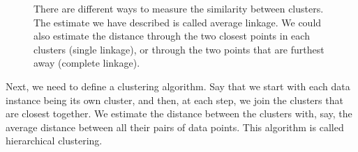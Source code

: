 \begin{figure}[h]
    \vspace{1cm}
    \centering
    \caption{There are different ways to measure the similarity between clusters. The estimate we have described is called average linkage. We could also estimate the distance through the two closest points in each clusters (single linkage), or through the two points that are furthest away (complete linkage).}
\end{figure}

Next, we need to define a clustering algorithm. Say that we start with each data instance being its own cluster, and then, at each step, we join the clusters that are closest together. We estimate the distance between the clusters with, say, the average distance between all their pairs of data points. This algorithm is called hierarchical clustering.

